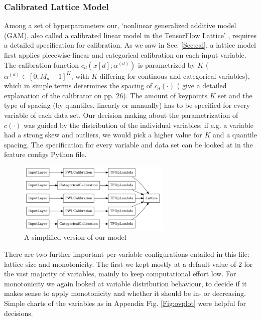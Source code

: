 \subsubsection*{Calibrated Lattice Model}

Among a set of hyperparameters our, `nonlinear generalized additive model (GAM), also called a calibrated linear model in the TensorFlow Lattice' \citep[Sec.~8]{wang2020deontological}, requires a detailed specification for calibration. As we saw in Sec. \ref{Sec:cal}, a lattice model first applies piecewise-linear and categorical calibration on each input variable. The calibration function $c_d(x[d]; \alpha^{(d)})$ is parametrized by $K$ ($\alpha^{(d)} \in [0, M_d - 1]^K$, with $K$ differing for continous and categorical variables), which in simple terms determines the spacing of $c_d(\cdot)$ (\cite{gupta2016monotonic} give a detailed explanation of the calibrator on pp. 26). The amount of keypoints $K$ set and the type of spacing (by quantiles, linearly or manually) has to be specified for every variable of each data set. Our decision making about the parametrization of $c(\cdot)$ was guided by the distribution of the individual variables; if e.g. a variable had a strong skew and outliers, we would pick a higher value for $K$ and a quantile spacing. The specification for every variable and data set can be looked at in the feature configs \textsf{Python} file. 

\begin{figure}[htb!]
	\centering
	\includegraphics[width=0.65\textwidth]{img/lat}
	\caption{A simplified version of our model}
	\label{Fig:lat}
\end{figure}

There are two further important per-variable configurations entailed in this file: lattice size and monotonicity. The first we kept mostly at a default value of $2$ for the vast majority of variables, mainly to keep computational effort low. For monotonicity we again looked at variable distribution behaviour, to decide if it makes sense to apply monotonicity and whether it should be in- or decreasing. Simple charts of the variables as in Appendix Fig. \ref{Fig:ovplot} were helpful for decisions.

